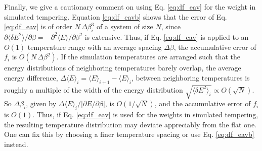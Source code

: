 \documentclass[aip,jcp,preprint,notitlepage, superscriptaddress]{revtex4-1}
\begin{document}
Finally, we give a cautionary comment
on using Eq. \eqref{eq:df_eav}
for the weight in simulated tempering\cite{park2007}.
%
Equation \eqref{eq:df_eavb} shows that
the error of Eq. \eqref{eq:df_eav}
is of order $N \, \Delta \beta_i^3$
of a system of size $N$,
since
$\partial \langle \delta E^2 \rangle / \partial \beta
= -\partial^2 \langle E \rangle / \partial \beta^2$
is extensive.
%
Thus,
if Eq. \eqref{eq:df_eav} is applied to
an $O(1)$ temperature range
with an average spacing $\Delta \beta$,
the accumulative error of $f_i$
is $O(N \, \Delta \beta^2)$.
%
If the simulation temperatures
are arranged
such that the energy distributions
of neighboring temperatures
barely overlap,
%
the average energy difference,
$\Delta \langle E \rangle_i = \langle E \rangle_{i+1} - \langle E \rangle_i$,
between neighboring temperatures
is roughly a multiple of the width of
the energy distribution
$\sqrt{ \langle \delta E^2 \rangle_i } \propto O(\sqrt{N})$.
%
So $\Delta \beta_i$,
given by $\Delta \langle E \rangle_i / |\partial E/\partial \beta|$,
is $O(1/\sqrt{N})$,
%
and the accumulative error
of $f_i$ is $O(1)$.
%
Thus, if Eq. \eqref{eq:df_eav}
is used for the weights
in simulated tempering\cite{park2007},
the resulting temperature distribution
may deviate appreciably
from the flat one.
%
One can fix this by choosing
a finer temperature spacing or
use Eq. \eqref{eq:df_eavb}
instead.




\end{document}
